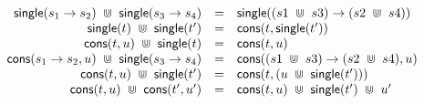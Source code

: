 \begin{mathpar}

\end{mathpar}




    

\[\begin{array}{rcl}
    \ptypsUnion{\ptypSingle{\tarr{s_1}{s_2}}}{\ptypSingle{\tarr{s_3}{s_4}}} & = & \ptypSingle{{\tarr{(\ptypsUnion{s1}{s3})}{(\ptypsUnion{s2}{s4})}}} \\
    \ptypsUnion{\ptypSingle{t}}{\ptypSingle{t'}} & = & \ptypCons{t}{\ptypSingle{t'}} \\
    \ptypsUnion{\ptypCons{t}{u}}{\ptypSingle{t}} & = & \ptypCons{t}{u} \\
    \ptypsUnion{\ptypCons{\tarr{s_1}{s_2}}{u}}{\ptypSingle{\tarr{s_3}{s_4}}} & = & \ptypCons{\tarr{(\ptypsUnion{s1}{s3})}{(\ptypsUnion{s2}{s4})}}{u} \\
    \ptypsUnion{\ptypCons{t}{u}}{\ptypSingle{t'}} & = & \ptypCons{t}{(\ptypsUnion{u}{\ptypSingle{t'}})} \\
    \ptypsUnion{\ptypCons{t}{u}}{\ptypCons{t'}{u'}} & = & \ptypsUnion{\ptypsUnion{\ptypCons{t}{u}}{\ptypSingle{t'}}}{u'} \\
\end{array}\] 

